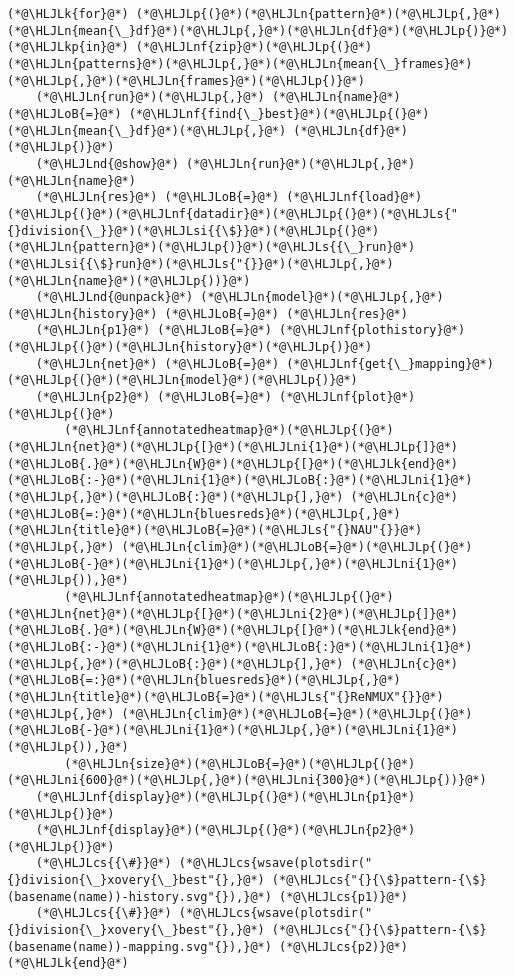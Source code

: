 \documentclass[12pt,a4paper]{article}
\newcommand{\HLJLk}[1]{\textcolor[RGB]{148,91,176}{\textbf{#1}}}
\newcommand{\HLJLkp}[1]{\textcolor[RGB]{148,91,176}{\textbf{#1}}}
\newcommand{\HLJLn}[1]{#1}
\newcommand{\HLJLnd}[1]{\textcolor[RGB]{214,102,97}{#1}}
\newcommand{\HLJLnf}[1]{\textcolor[RGB]{66,102,213}{#1}}
\newcommand{\HLJLs}[1]{\textcolor[RGB]{201,61,57}{#1}}
\newcommand{\HLJLsi}[1]{#1}
\newcommand{\HLJLni}[1]{\textcolor[RGB]{59,151,46}{#1}}
\newcommand{\HLJLoB}[1]{\textcolor[RGB]{102,102,102}{\textbf{#1}}}
\newcommand{\HLJLp}[1]{#1}
\newcommand{\HLJLcs}[1]{\textcolor[RGB]{153,153,119}{\textit{#1}}}
\begin{document}
\begin{lstlisting}
(*@\HLJLk{for}@*) (*@\HLJLp{(}@*)(*@\HLJLn{pattern}@*)(*@\HLJLp{,}@*)(*@\HLJLn{mean{\_}df}@*)(*@\HLJLp{,}@*)(*@\HLJLn{df}@*)(*@\HLJLp{)}@*) (*@\HLJLkp{in}@*) (*@\HLJLnf{zip}@*)(*@\HLJLp{(}@*)(*@\HLJLn{patterns}@*)(*@\HLJLp{,}@*)(*@\HLJLn{mean{\_}frames}@*)(*@\HLJLp{,}@*)(*@\HLJLn{frames}@*)(*@\HLJLp{)}@*)
    (*@\HLJLn{run}@*)(*@\HLJLp{,}@*) (*@\HLJLn{name}@*) (*@\HLJLoB{=}@*) (*@\HLJLnf{find{\_}best}@*)(*@\HLJLp{(}@*)(*@\HLJLn{mean{\_}df}@*)(*@\HLJLp{,}@*) (*@\HLJLn{df}@*)(*@\HLJLp{)}@*)
    (*@\HLJLnd{@show}@*) (*@\HLJLn{run}@*)(*@\HLJLp{,}@*) (*@\HLJLn{name}@*)
    (*@\HLJLn{res}@*) (*@\HLJLoB{=}@*) (*@\HLJLnf{load}@*)(*@\HLJLp{(}@*)(*@\HLJLnf{datadir}@*)(*@\HLJLp{(}@*)(*@\HLJLs{"{}division{\_}}@*)(*@\HLJLsi{{\$}}@*)(*@\HLJLp{(}@*)(*@\HLJLn{pattern}@*)(*@\HLJLp{)}@*)(*@\HLJLs{{\_}run}@*)(*@\HLJLsi{{\$}run}@*)(*@\HLJLs{"{}}@*)(*@\HLJLp{,}@*) (*@\HLJLn{name}@*)(*@\HLJLp{))}@*)
    (*@\HLJLnd{@unpack}@*) (*@\HLJLn{model}@*)(*@\HLJLp{,}@*) (*@\HLJLn{history}@*) (*@\HLJLoB{=}@*) (*@\HLJLn{res}@*)
    (*@\HLJLn{p1}@*) (*@\HLJLoB{=}@*) (*@\HLJLnf{plothistory}@*)(*@\HLJLp{(}@*)(*@\HLJLn{history}@*)(*@\HLJLp{)}@*)
    (*@\HLJLn{net}@*) (*@\HLJLoB{=}@*) (*@\HLJLnf{get{\_}mapping}@*)(*@\HLJLp{(}@*)(*@\HLJLn{model}@*)(*@\HLJLp{)}@*)
    (*@\HLJLn{p2}@*) (*@\HLJLoB{=}@*) (*@\HLJLnf{plot}@*)(*@\HLJLp{(}@*)
        (*@\HLJLnf{annotatedheatmap}@*)(*@\HLJLp{(}@*)(*@\HLJLn{net}@*)(*@\HLJLp{[}@*)(*@\HLJLni{1}@*)(*@\HLJLp{]}@*)(*@\HLJLoB{.}@*)(*@\HLJLn{W}@*)(*@\HLJLp{[}@*)(*@\HLJLk{end}@*)(*@\HLJLoB{:-}@*)(*@\HLJLni{1}@*)(*@\HLJLoB{:}@*)(*@\HLJLni{1}@*)(*@\HLJLp{,}@*)(*@\HLJLoB{:}@*)(*@\HLJLp{],}@*) (*@\HLJLn{c}@*)(*@\HLJLoB{=:}@*)(*@\HLJLn{bluesreds}@*)(*@\HLJLp{,}@*) (*@\HLJLn{title}@*)(*@\HLJLoB{=}@*)(*@\HLJLs{"{}NAU"{}}@*)(*@\HLJLp{,}@*) (*@\HLJLn{clim}@*)(*@\HLJLoB{=}@*)(*@\HLJLp{(}@*)(*@\HLJLoB{-}@*)(*@\HLJLni{1}@*)(*@\HLJLp{,}@*)(*@\HLJLni{1}@*)(*@\HLJLp{)),}@*)
        (*@\HLJLnf{annotatedheatmap}@*)(*@\HLJLp{(}@*)(*@\HLJLn{net}@*)(*@\HLJLp{[}@*)(*@\HLJLni{2}@*)(*@\HLJLp{]}@*)(*@\HLJLoB{.}@*)(*@\HLJLn{W}@*)(*@\HLJLp{[}@*)(*@\HLJLk{end}@*)(*@\HLJLoB{:-}@*)(*@\HLJLni{1}@*)(*@\HLJLoB{:}@*)(*@\HLJLni{1}@*)(*@\HLJLp{,}@*)(*@\HLJLoB{:}@*)(*@\HLJLp{],}@*) (*@\HLJLn{c}@*)(*@\HLJLoB{=:}@*)(*@\HLJLn{bluesreds}@*)(*@\HLJLp{,}@*) (*@\HLJLn{title}@*)(*@\HLJLoB{=}@*)(*@\HLJLs{"{}ReNMUX"{}}@*)(*@\HLJLp{,}@*) (*@\HLJLn{clim}@*)(*@\HLJLoB{=}@*)(*@\HLJLp{(}@*)(*@\HLJLoB{-}@*)(*@\HLJLni{1}@*)(*@\HLJLp{,}@*)(*@\HLJLni{1}@*)(*@\HLJLp{)),}@*)
        (*@\HLJLn{size}@*)(*@\HLJLoB{=}@*)(*@\HLJLp{(}@*)(*@\HLJLni{600}@*)(*@\HLJLp{,}@*)(*@\HLJLni{300}@*)(*@\HLJLp{))}@*)
    (*@\HLJLnf{display}@*)(*@\HLJLp{(}@*)(*@\HLJLn{p1}@*)(*@\HLJLp{)}@*)
    (*@\HLJLnf{display}@*)(*@\HLJLp{(}@*)(*@\HLJLn{p2}@*)(*@\HLJLp{)}@*)
    (*@\HLJLcs{{\#}}@*) (*@\HLJLcs{wsave(plotsdir("{}division{\_}xovery{\_}best"{},}@*) (*@\HLJLcs{"{}{\$}pattern-{\$}(basename(name))-history.svg"{}),}@*) (*@\HLJLcs{p1)}@*)
    (*@\HLJLcs{{\#}}@*) (*@\HLJLcs{wsave(plotsdir("{}division{\_}xovery{\_}best"{},}@*) (*@\HLJLcs{"{}{\$}pattern-{\$}(basename(name))-mapping.svg"{}),}@*) (*@\HLJLcs{p2)}@*)
(*@\HLJLk{end}@*)
\end{lstlisting}
\end{document}
